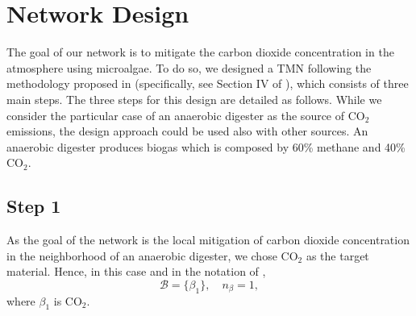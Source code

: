 \documentclass[lettersize,journal]{IEEEtran}
\begin{document}
\section{Network Design}\label{sec:netDesign}
The goal of our network is to mitigate the carbon dioxide concentration in the atmosphere using microalgae. To do so, we designed a TMN following the methodology proposed in \cite{zocco2023thermodynamical} (specifically, see Section IV of \cite{zocco2023thermodynamical}), which consists of three main steps. The three steps for this design are detailed as follows. While we consider the particular case of an anaerobic digester as the source of $\text{CO}_2$ emissions, the design approach could be used also with other sources. An anaerobic digester produces biogas which is composed by 60\% methane and 40\% $\text{CO}_2$. 



\subsection{Step 1}\label{subsec:Step1} 
As the goal of the network is the local mitigation of carbon dioxide concentration in the neighborhood of an anaerobic digester, we chose $\text{CO}_2$ as the target material. Hence, in this case and in the notation of \cite{zocco2023thermodynamical},
\begin{equation}
\mathcal{B} = \{\beta_1\}, \quad n_\beta = 1,
\end{equation}
where $\beta_1$ is $\text{CO}_2$. 
 
\end{document}
